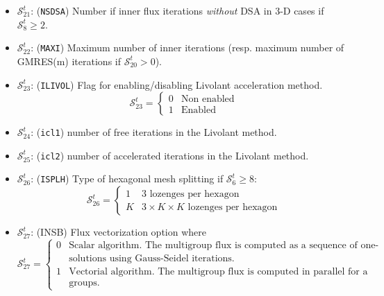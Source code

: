 \begin{itemize}
\item $\mathcal{S}^{t}_{21}$: ({\tt NSDSA}) Number if inner flux iterations {\sl without} DSA in 3-D
cases if $\mathcal{S}^{t}_{8} \ge 2$.

\item $\mathcal{S}^{t}_{22}$: ({\tt MAXI}) Maximum number of inner iterations (resp. maximum number of GMRES(m) iterations if $\mathcal{S}^{t}_{20}>0$).

\item $\mathcal{S}^{t}_{23}$: ({\tt ILIVOL}) Flag for enabling/disabling Livolant acceleration method.
\begin{displaymath}
\mathcal{S}^{t}_{23} = \left\{
\begin{array}{rl}
 0 & \textrm{Non enabled} \\
 1 & \textrm{Enabled}
\end{array} \right.
\end{displaymath}

\item $\mathcal{S}^{t}_{24}$: ({\tt icl1}) number of free iterations in the Livolant method.
\item $\mathcal{S}^{t}_{25}$: ({\tt icl2}) number of accelerated iterations in the Livolant method.
\item $\mathcal{S}^{t}_{26}$: ({\tt ISPLH}) Type of hexagonal mesh splitting if $\mathcal{S}^{t}_{6}\ge 8$:
\begin{displaymath}
\mathcal{S}^{t}_{26} = \left\{
\begin{array}{rl}
 1 & \textrm{$3$ lozenges per hexagon} \\
 K & \textrm{$3\times K \times K$ lozenges per hexagon}
\end{array} \right.
\end{displaymath}

\item $\mathcal{S}^{t}_{27}$: (INSB) Flux vectorization option where
\begin{displaymath}
\mathcal{S}^{t}_{27} = \left\{
\begin{array}{rl}
 0 & \textrm{Scalar algorithm. The multigroup flux is computed as a sequence of one-group}\\
 & \textrm{solutions using Gauss-Seidel iterations.} \\
 1 & \textrm{Vectorial algorithm. The multigroup flux is computed in parallel for a set of energy}\\
 & \textrm{groups.}
\end{array} \right.
\end{displaymath}


\end{itemize}
